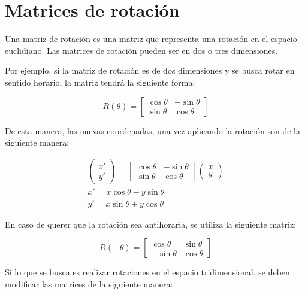 
\section*{Matrices de rotaci\'on}
Una matriz de rotaci\'on es una matriz que representa una rotaci\'on en el
espacio euclidiano. Las matrices de rotaci\'on pueden ser en dos o tres
dimensiones.
	
Por ejemplo, si la matriz de rotaci\'on es de dos dimensiones y se busca rotar
en sentido horario, la matriz tendrá la siguiente forma:

\begin{equation}
	R(\theta)=
	\begin{bmatrix}
		\cos \theta & -\sin \theta\\
		\sin \theta & \cos \theta
	\end{bmatrix}
\end{equation}

De esta manera, las nuevas coordenadas, una vez aplicando la rotación son de la
siguiente manera:

\begin{eqnarray}
	\left(
	\begin{matrix}
		x'\\
		y'
	\end{matrix}
	\right)
	=
	\begin{bmatrix}
		\cos \theta & -\sin \theta\\
		\sin \theta & \cos \theta
	\end{bmatrix}
	\left(
	\begin{matrix}
		x\\
		y
	\end{matrix}
	\right)\\
	x'=x\cos \theta -y\sin \theta\\
	y'=x\sin \theta + y \cos \theta
\end{eqnarray}

En caso de querer que la rotación sea antihoraria, se utiliza la siguiente
matriz:

\begin{equation}
	R(-\theta)=
	\begin{bmatrix}
		\cos \theta & \sin \theta\\
		-\sin \theta & \cos \theta
	\end{bmatrix}
\end{equation}

Si lo que se busca es realizar rotaciones en el espacio tridimensional, se deben
modificar las matrices de la siguiente manera:

